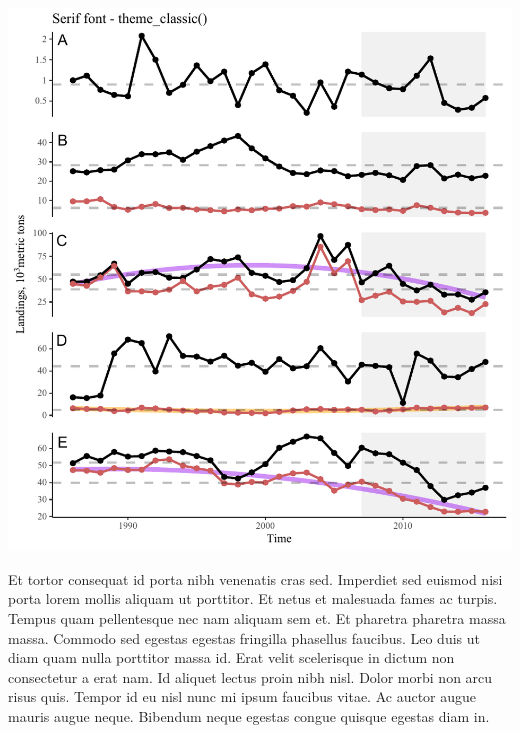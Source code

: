 \documentclass[11pt,]{article}
\begin{document}
\includegraphics{font_test_files/figure-latex/unnamed-chunk-2-1.pdf}

Et tortor consequat id porta nibh venenatis cras sed. Imperdiet sed
euismod nisi porta lorem mollis aliquam ut porttitor. Et netus et
malesuada fames ac turpis. Tempus quam pellentesque nec nam aliquam sem
et. Et pharetra pharetra massa massa. Commodo sed egestas egestas
fringilla phasellus faucibus. Leo duis ut diam quam nulla porttitor
massa id. Erat velit scelerisque in dictum non consectetur a erat nam.
Id aliquet lectus proin nibh nisl. Dolor morbi non arcu risus quis.
Tempor id eu nisl nunc mi ipsum faucibus vitae. Ac auctor augue mauris
augue neque. Bibendum neque egestas congue quisque egestas diam in.
\end{document}
